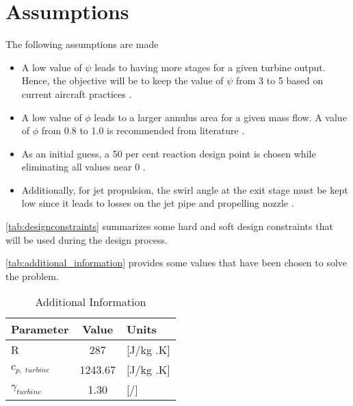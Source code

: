 \section{Assumptions} \label{sec:assumptions}
The following assumptions are made \cite{saravanamuttoo2017}
\begin{itemize}
  \item A low value of $\psi$ leads to having more stages for a given turbine output. Hence, the objective will be to keep the value of $\psi$ from 3 to 5 based on current aircraft practices \cite{gt_theory}.
  \item A low value of $\phi$ leads to a larger annulus area for a given mass flow. A value of $\phi$ from 0.8 to 1.0 is recommended from literature \cite{gt_theory}.
  \item As an initial guess, a 50 per cent reaction design point is chosen while eliminating all values near 0 \cite{axialflowturbines}.
  \item Additionally, for jet propulsion, the swirl angle at the exit stage must be kept low since it leads to losses on the jet pipe and propelling nozzle \cite{farokhi2021aircraft}.
\end{itemize} 

\autoref{tab:designconstraints} summarizes some hard and soft design constraints that will be used during the
design process.


\autoref{tab:additional_information} provides some values that have been chosen to solve the problem.
\begin{table}[H]
  \caption{Additional Information}
  \label{tab:additional_information}
  \centering
  \begin{tabular}[H]{l c l}
  \toprule[1pt]
  \textbf{Parameter} & \textbf{Value} & \textbf{Units}  \\
  \midrule
  R                 &   287  &  [J/kg .K]  \\
  $c_{p, \; turbine}$   &   1243.67 &  [J/kg .K]  \\
  $\gamma_{turbine }$ & 1.30& [/]\\

  
  \midrule[1pt]
  \end{tabular}
\end{table}

\clearpage